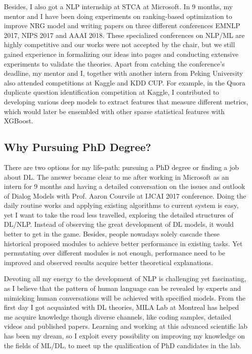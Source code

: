 \documentclass[16pt，letterpaper]{ctexart}
\begin{document}
Besides, I also got a NLP internship at STCA at Microsoft. In 9 months, my mentor and I have been doing experiments on ranking-based optimization to improve NRG model and writing papers on three different conferences EMNLP 2017, NIPS 2017 and AAAI 2018. These specialized conferences on NLP/ML are highly competitive and our works were not accepted by the chair, but we still gained experience in formalizing our ideas into pages and conducting extensive experiments to validate the theories. Apart from catching the conference's deadline, my mentor and I, together with another intern from Peking University also attended competitions at Kaggle and KDD CUP. For example, in the Quora duplicate question identification competition at Kaggle, I contributed to developing various deep models to extract features that measure different metrics, which would later be ensembled with other sparse statistical features with XGBoost.

\subsection{Why Pursuing PhD Degree?}
There are two options for my life-path: pursuing a PhD degree or finding a job about DL. The answer became clear to me after working in Microsoft as an intern for 9 months and having a detailed conversation on the issues and outlook of Dialog Models with Prof. Aaron Courvile at IJCAI 2017 conference. Doing the daily routine works and applying existing algorithms to current system is easy, yet I want to take the road less travelled, exploring the detailed structures of DL/NLP. Instead of observing the great development of DL models, it would better to get in the game. Besides, people nowadays solely cascade these historical proposed modules to achieve better performance in existing tasks. Yet permutating over different modules is not enough, performance need to be improved and observed results acquire better theoretical explanations.

Devoting all my energy to the development of NLP is challenging yet fascinating, as I believe that the pattern of human language can be revealed by experts and mimicking human conversations will be achieved with specified models. From the first day I got acquainted with DL theories, MILA Lab at Montreal has helped me acquire knowledge though diverse channels, like coding samples, detailed videos and published papers. Learning and working at this advanced scientific lab has been my dream, so I exploit every possibility on improving my knowledge on the fields of ML/DL, to meet up the qualification of PhD candidates in the lab.
\end{document}
